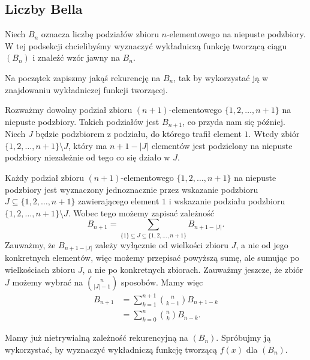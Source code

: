 \documentclass[shortabstract]{imthesis}
\begin{document}
\subsection{Liczby Bella}

Niech $B_n$ oznacza liczbę podziałów zbioru $n$-elementowego na niepuste podzbiory. W tej podsekcji chcielibyśmy wyznaczyć wykładniczą funkcję tworzącą ciągu $(B_n)$ i znaleźć wzór jawny na $B_n$.

Na początek zapiszmy jakąś rekurencję na $B_n$, tak by wykorzystać ją w znajdowaniu wykładniczej funkcji tworzącej.

Rozważmy dowolny podział zbioru $(n+1)$-elementowego $\{1, 2, \ldots, n+1\}$ na niepuste podzbiory. Takich podziałów jest $B_{n+1}$, co przyda nam się później. Niech $J$ będzie podzbiorem z podziału, do którego trafił element $1$. Wtedy zbiór $\{1, 2, \ldots, n+1\} \setminus J$, który ma $n+1-|J|$ elementów jest podzielony na niepuste podzbiory niezależnie od tego co się działo w $J$.

Każdy podział zbioru $(n+1)$-elementowego $\{1, 2, \ldots, n+1\}$ na niepuste podzbiory jest wyznaczony jednoznacznie przez wskazanie podzbioru $J \subseteq \{1, 2, \ldots, n+1\}$ zawierającego element $1$ i wskazanie podziału podzbioru $\{1, 2, \ldots, n+1\} \setminus J$. Wobec tego możemy zapisać zależność
$$
B_{n+1} = \sum_{\{1\} \subseteq J \subseteq \{1, 2, \ldots, n+1\}} B_{n+1-|J|}.
$$
Zauważmy, że $B_{n+1-|J|}$ zależy wyłącznie od wielkości zbioru $J$, a nie od jego konkretnych elementów, więc możemy przepisać powyższą sumę, ale sumując po wielkościach zbioru $J$, a nie po konkretnych zbiorach. Zauważmy jeszcze, że zbiór $J$ możemy wybrać na ${n \choose |J|-1}$ sposobów. Mamy więc
\begin{align*}
B_{n+1} &= \sum_{k=1}^{n+1} {n \choose k-1} B_{n+1-k} \\
&= \sum_{k=0}^{n} {n \choose k} B_{n-k}.
\end{align*}

Mamy już nietrywialną zależność rekurencyjną na $(B_n)$. Spróbujmy ją wykorzystać, by wyznaczyć wykładniczą funkcję tworzącą $f(x)$ dla $(B_n)$.
\end{document}
